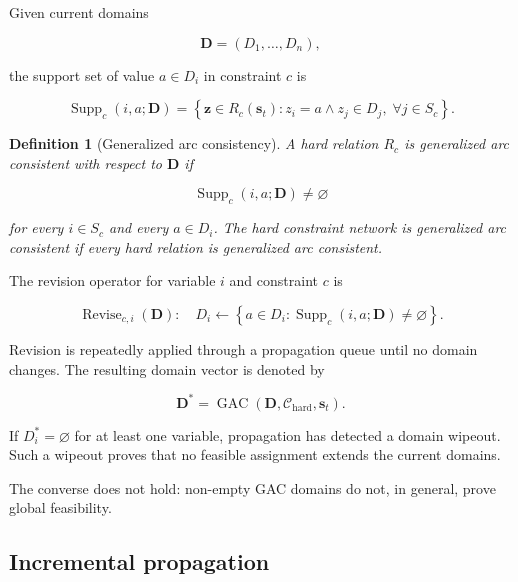\documentclass[pdflatex,sn-mathphys-num,iicol,oneside]{sn-jnl}
\newtheorem{definition}{Definition}
\begin{document}
Given current domains

\begin{equation}
\bm{D}=(D_1,\ldots,D_n),
\end{equation}

the support set of value $a\in D_i$ in constraint $c$ is

\begin{equation}
\operatorname{Supp}_{c}
(i,a;\bm{D})
=
\left\{
\bm{z}\in R_c(\bm{s}_t):
z_i=a
\land
z_j\in D_j,\;
\forall j\in S_c
\right\}.
\label{eq:support}
\end{equation}

\begin{definition}[Generalized arc consistency]
A hard relation $R_c$ is generalized arc consistent with respect to
$\bm{D}$ if

\begin{equation}
\operatorname{Supp}_{c}(i,a;\bm{D})
\neq\varnothing
\end{equation}

for every $i\in S_c$ and every $a\in D_i$. The hard constraint
network is generalized arc consistent if every hard relation is
generalized arc consistent.
\end{definition}

The revision operator for variable $i$ and constraint $c$ is

\begin{equation}
\operatorname{Revise}_{c,i}(\bm{D}):
\quad
D_i
\leftarrow
\left\{
a\in D_i:
\operatorname{Supp}_{c}(i,a;\bm{D})
\neq\varnothing
\right\}.
\label{eq:revise}
\end{equation}

Revision is repeatedly applied through a propagation queue until no
domain changes. The resulting domain vector is denoted by

\begin{equation}
\bm{D}^{*}
=
\operatorname{GAC}
\left(
\bm{D},
\mathcal{C}_{\mathrm{hard}},
\bm{s}_t
\right).
\label{eq:gac-closure}
\end{equation}

If $D_i^{*}=\varnothing$ for at least one variable, propagation has
detected a domain wipeout. Such a wipeout proves that no feasible
assignment extends the current domains.

The converse does not hold: non-empty GAC domains do not, in general,
prove global feasibility.

\subsection{Incremental propagation}
\end{document}
